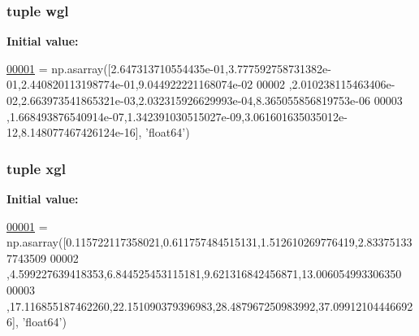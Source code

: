 \subsubsection[{wgl}]{\setlength{\rightskip}{0pt plus 5cm}tuple wgl}\label{namespacepyneb_1_1utils_1_1__chianti__constants_a194c43506d8baeaec4a0a9bdefdc02d2}
{\bfseries Initial value\+:}
\begin{DoxyCode}
\hypertarget{namespacepyneb_1_1utils_1_1__chianti__constants_l00001}{}\hyperlink{namespacepyneb_1_1utils_1_1__chianti__constants}{00001} = np.asarray([2.647313710554435e-01,3.777592758731382e-01,2.440820113198774e-01,9.044922221168074e-02
00002     ,2.010238115463406e-02,2.663973541865321e-03,2.032315926629993e-04,8.365055856819753e-06
00003     ,1.668493876540914e-07,1.342391030515027e-09,3.061601635035012e-12,8.148077467426124e-16], \textcolor{stringliteral}{'float64'})
\end{DoxyCode}
\hypertarget{namespacepyneb_1_1utils_1_1__chianti__constants_af3a02e5ae60445205fcd7a5a940fae65}{}
\subsubsection[{xgl}]{\setlength{\rightskip}{0pt plus 5cm}tuple xgl}\label{namespacepyneb_1_1utils_1_1__chianti__constants_af3a02e5ae60445205fcd7a5a940fae65}
{\bfseries Initial value\+:}
\begin{DoxyCode}
\hypertarget{namespacepyneb_1_1utils_1_1__chianti__constants_l00001}{}\hyperlink{namespacepyneb_1_1utils_1_1__chianti__constants}{00001} = np.asarray([0.115722117358021,0.611757484515131,1.512610269776419,2.833751337743509
00002     ,4.599227639418353,6.844525453115181,9.621316842456871,13.006054993306350
00003     ,17.116855187462260,22.151090379396983,28.487967250983992,37.099121044466926], \textcolor{stringliteral}{'float64'})
\end{DoxyCode}
